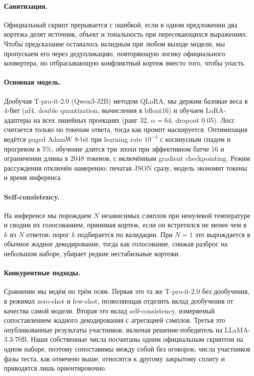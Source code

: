 \documentclass[11pt]{article}
\begin{document}
\paragraph{Санитизация.}
Официальный скрипт прерывается с ошибкой, если в одном предложении два кортежа делят источник, объект и
тональность при пересекающихся выражениях. Чтобы предсказание оставалось валидным при любом выходе модели, мы
пропускаем его через дедупликацию, повторяющую логику официального конвертера, но отбрасывающую конфликтный
кортеж вместо того, чтобы упасть.

\paragraph{Основная модель.}
Дообучая T-pro-it-2.0 (Qwen3-32B) методом QLoRA, мы держим базовые веса в 4-бит (nf4, double quantization,
вычисления в bfloat16) и обучаем LoRA-адаптеры на всех линейных проекциях (ранг 32, $\alpha = 64$, dropout 0.05).
Лосс считается только по токенам ответа, тогда как промпт маскируется. Оптимизация ведётся paged AdamW 8-bit при
learning rate $10^{-4}$ с косинусным спадом и прогревом в 5\%; обучение длится три эпохи при эффективном батче 16
и ограничении длины в 2048 токенов, с включённым gradient checkpointing. Режим рассуждения отключён намеренно:
печатая JSON сразу, модель экономит токены и время инференса.

\paragraph{Self-consistency.}
На инференсе мы порождаем $N$ независимых сэмплов при ненулевой температуре и сводим их голосованием, принимая
кортеж, если он встретился не менее чем в $k$ из $N$ ответов; порог $k$ подбирается по валидации. При $N=1$ это
вырождается в обычное жадное декодирование, тогда как голосование, снижая разброс на небольшом наборе, убирает
редкие нестабильные кортежи.

\paragraph{Конкурентные подходы.}
Сравнение мы ведём по трём осям. Первая это та же T-pro-it-2.0 без дообучения, в режимах zero-shot и few-shot,
позволяющая отделить вклад дообучения от качества самой модели. Вторая это вклад self-consistency, измеряемый
сопоставлением жадного декодирования с агрегацией сэмплов. Третья это опубликованные результаты участников,
включая решение-победитель на LLaMA-3.3-70B. Наши собственные числа посчитаны одним официальным скриптом на одном
наборе, поэтому сопоставимы между собой без оговорок; числа участников фазы теста, как отмечено выше, относятся к
другому закрытому сплиту и приводятся лишь ориентировочно.
\end{document}
